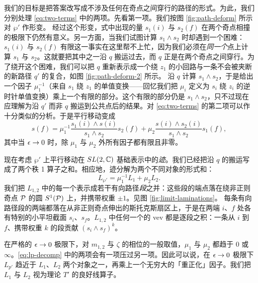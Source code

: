 我们的目标是把答案改写成不涉及任何在奇点之间穿行的路径的形式。为此，我们分别处理 \eqref{eq:two-terms} 中的两项。先看第一项。我们按图 \ref{fig:path-deform} 所示对 $\wp'$ 作形变。
经过这个形变，式中出现的量 $s_1(i)$ 与 $s_2(f)$ 在两个奇点相撞的极限下仍然有意义。另一方面，当我们试图计算 $s_1 \wedge s_2$ 时却遇到一个困难：$s_1(i)$ 与 $s_2(f)$ 有限这一事实在这里帮不上忙，因为我们必须在\emph{同一个}点上计算 $s_1$ 与 $s_2$。这就要把其中之一沿 $q$ 搬运过去，而 $q$ 正是在两个奇点之间穿行。为了绕开这个困难，我们可以把 $q$ 重新表示成一个绕 $z_1$ 的小回路与一条不会被夹断的新路径 $q'$ 的复合，如图 \ref{fig:path-deform-2} 所示。
沿 $q$ 计算 $s_1 \wedge s_2$，于是给出一个因子 $\mu_1^{-1}$（来自 $s_1$ 绕 $z_1$ 的单值变换——回忆我们把 $\mu_i$ 定义为 $s_i$ 绕 $z_i$ 的逆时针单值变换）乘上一个有限的部分。这个有限的部分仍是 $s_1 \wedge s_2$，只不过现在应理解为沿 $q'$ 而非 $q$ 搬运到公共点后的结果。对 \eqref{eq:two-terms} 的第二项可以作十分类似的分析。于是平行移动变成
\begin{equation}
 s(f) = \mu_1^{-1} \frac{s_1(i) \wedge s(i)}{s_1 \wedge s_2} s_2(f) + \mu_2 \frac{s(i) \wedge s_2(i)}{s_1 \wedge s_2} s_1(f),
\end{equation}
其中当 $\epsilon \to 0$ 时，除 $\mu_1$ 与 $\mu_2$ 外所有因子都有限且非零。

现在考虑 $\wp'$ 上平行移动在 $SL(2,\mathbb{C})$ 基础表示中的\emph{迹}。我们已经把沿 $q$ 的搬运写成了两个秩 1 算子之和。相应地，迹分解为两个不同对象的形式和：
\begin{equation} \label{eq:lp-decomp}
 L_{\wp'} = \mu_1^{-1} L_1 + \mu_2 L_2.
\end{equation}
我们把 $L_{1,2}$ 中的每一个表示成若干有向路径\emph{段}之并：这些段的端点落在绕非正则奇点 $\mathcal{P}$ 的圆 $S^1(\mathcal{P})$ 上，并携带权重 $\pm 1$。见图 \ref{fig:limit-laminations}。
每条有向路径段的两端都落在从非正则奇点伸出的斯托克斯扇区上，于是在两端 $i$、$f$ 处各有特别的小平坦截面 $s_i$、$s_f$。$L_{1,2}$ 中任何一个的 vev 都是逐段之积：一条从 $i$ 到 $f$、携带权重 $k$ 的段贡献 $(s_i \wedge s_f)^k$。

在严格的 $\epsilon \to 0$ 极限下，对 $m_{1,2}$ 与 $\zeta$ 的相位的一般取值，$\mu_1$ 与 $\mu_2$ 都趋于 $0$ 或 $\infty$。\eqref{eq:lp-decomp} 中的两项会有一项压过另一项。因此可以说，在 $\epsilon \to 0$ 极限下 $L_{p'}$ 趋近于 $L_1$、$L_2$ 两个对象之一，再乘上一个无穷大的「重正化」因子。我们把 $L_1$ 与 $L_2$ 视为理论 $T'$ 的良好线算子。

